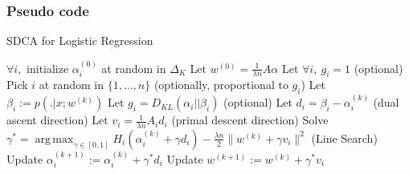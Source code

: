 \documentclass{beamer}
\DeclareMathOperator{\1}{\mathbb{1}}
\DeclareMathOperator*{\argmax}{arg\,max}
\begin{document}
\begin{frame}[fragile]
\frametitle{Pseudo code}

\begin{algorithm}[H]
    \caption{SDCA for Logistic Regression}
    \label{sdca for logreg}
\begin{algorithmic}
        \STATE $\forall i,$ initialize $\alpha_i^{(0)}$ at random in $\Delta_K$
        \STATE Let $w^{(0)} = \frac{1}{\lambda n} A \alpha$  
        \STATE Let $\forall i,\  g_i = 1$ (optional)
                \STATE Pick $i$ at random in $\{1,\ldots,n\}$ (optionally, proportional to $g_i$)
                \STATE Let $ \beta_i := p( . |x ; w^{(k)})$
                \STATE Let $g_i = D_{KL}(\alpha_i || \beta_i)$ (optional)
                \STATE Let $d_i = \beta_i - \alpha_i^{(k)}$ (dual ascent direction)
                \STATE Let $v_i = \frac{1}{\lambda n} A_i d_i $ (primal descent direction)
                \STATE Solve $\gamma^* = \argmax_{\gamma \in [0,1]} H_i(\alpha_i^{(k)} + \gamma d_i) - \frac{\lambda n}{2} \| w^{(k)} + \gamma v_i \|^2$ (Line Search)
               \STATE Update $\alpha_i^{(k+1)} := \alpha_i^{(k)} + \gamma^* d_i$
               \STATE Update $w^{(k+1)} := w^{(k)} + \gamma^* v_i $
        \ENDFOR
\end{algorithmic}
\end{algorithm}
\end{frame}
\end{document}
